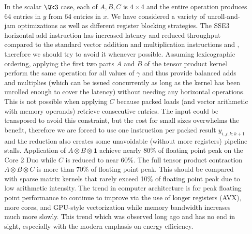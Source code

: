 In the scalar $\Qk 3$ case, each of $A,B,C$ is $4\times 4$ and the entire operation produces 64 entries in $y$ from 64 entries in $x$.
We have considered a variety of unroll-and-jam optimizations as well as different register blocking strategies.
The SSE3 horizontal add instruction  has increased latency and reduced throughput compared to the standard vector addition and multiplication instructions  and , therefore we should try to avoid it whenever possible.
Assuming lexicographic ordering, applying the first two parts $A$ and $B$ of the tensor product kernel perform the same operation for all values of $\gamma$ and thus provide balanced adds and multiplies (which can be issued concurrently as long as the kernel has been unrolled enough to cover the latency) without needing any horizontal operations.
This is not possible when applying $C$ because packed loads (and vector arithmetic with memory operands) retrieve consecutive entries.
The input could be transposed to avoid this constraint, but the cost for small sizes overwhelms the benefit, therefore we are forced to use one  instruction per packed result $y_{i,j,k:k+1}$ and the reduction also creates some unavoidable (without more registers) pipeline stalls.
Application of $A\otimes B\otimes \bm 1$ achieve nearly 80\% of floating point peak on the Core 2 Duo while $C$ is reduced to near 60\%.
The full tensor product contraction $A\otimes B\otimes C$ is more than 70\% of floating point peak.
This should be compared with sparse matrix kernels that rarely exceed 10\% of floating point peak due to low arithmetic intensity.
The trend in computer architecture is for peak floating point performance to continue to improve via the use of longer registers (AVX), more cores, and GPU-style vectorization while memory bandwidth increases much more slowly.
This trend which was observed long ago \cite{mccalpin1995mba} and has no end in sight, especially with the modern emphasis on energy efficiency.




